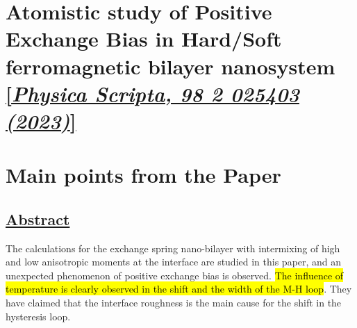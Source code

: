 \section{Atomistic study of Positive Exchange Bias in Hard/Soft ferromagnetic bilayer nanosystem \href{https://doi.org/10.1088/1402-4896/acb23c}{[\textit{Physica Scripta, 98 2 025403 (2023)}]}}


\section*{Main points from the Paper}
\subsection*{\centering\underline{Abstract}}
\hspace{2cm} The calculations for the exchange spring nano-bilayer with intermixing of high and low anisotropic moments at the interface are studied in this paper, and an unexpected phenomenon of positive exchange bias is observed. \hl{The influence of temperature is clearly observed in the shift and the width of the M-H loop}. They have claimed that the interface roughness is the main cause for the shift in the hysteresis loop.    
